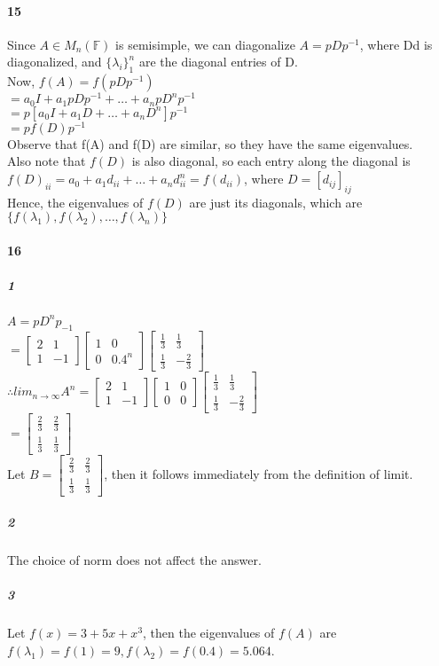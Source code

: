 \documentclass[10pt,letter]{article}
\begin{document}
\paragraph{15}
Since $A\in M_n(\mathbb{F})$ is semisimple, we can diagonalize $A=pDp^{-1}$, where Dd is diagonalized, and $\{\lambda_i\}_1^n$ are the diagonal entries of D. \\
Now, $f(A)=f(pDp^{-1})$\\
$=a_0 I+ a_1pDp^{-1}+\dots+a_npD^np^{-1}$\\
$=p[a_0I+a_1D+\dots+a_nD^n]p^{-1}$\\
$=pf(D)p^{-1}$\\
Observe that f(A) and f(D) are similar, so they have the same eigenvalues. \\
Also note that $f(D)$ is also diagonal, so each entry along the diagonal is $f(D)_{ii}=a_0+a_1d_{ii}+\dots+a_nd_{ii}^n=f(d_{ii})$, where $D=[d_{ij}]_{ij}$\\
Hence, the eigenvalues of $f(D)$ are just its diagonals, which are $\{f(\lambda_1),f(\lambda_2),\dots,f(\lambda_n) \}$
\paragraph{16}
\subparagraph{1}
$A=pD^np_{-1}$\\
$=\begin{bmatrix}
2&1\\1&-1
\end{bmatrix}\begin{bmatrix}
1&0\\0&0.4^n
\end{bmatrix}\begin{bmatrix}
\frac{1}{3}&\frac{1}{3}\\\frac{1}{3}&-\frac{2}{3}
\end{bmatrix}$\\
$\therefore lim_{n\to\infty}A^n=\begin{bmatrix}
2&1\\1&-1
\end{bmatrix}\begin{bmatrix}
1&0\\0&0
\end{bmatrix}\begin{bmatrix}
\frac{1}{3}&\frac{1}{3}\\\frac{1}{3}&-\frac{2}{3}
\end{bmatrix}$\\
$=\begin{bmatrix}
\frac{2}{3}&\frac{2}{3}\\\frac{1}{3}&\frac{1}{3}
\end{bmatrix}$\\
Let $B=\begin{bmatrix}
\frac{2}{3}&\frac{2}{3}\\\frac{1}{3}&\frac{1}{3}
\end{bmatrix}$, then it follows immediately from the definition of limit. 
\subparagraph{2}
The choice of norm does not affect the answer. 
\subparagraph{3}
Let $f(x)=3+5x+x^3$, then the eigenvalues of $f(A)$ are $f(\lambda_1)= f(1)=9, f(\lambda_2)= f(0.4)=5.064$. 
\end{document}
